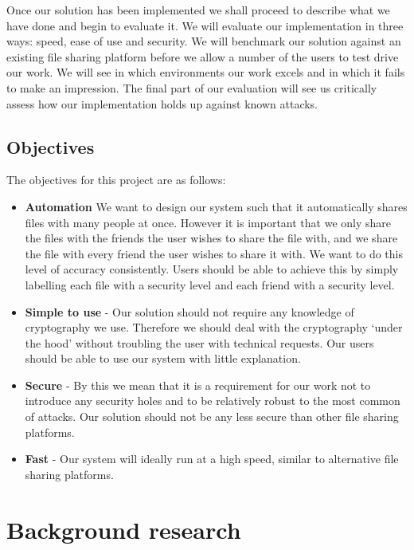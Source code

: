 \documentclass[12pt, titlepage]{article}
\begin{document}
\newline \indent Once our solution has been implemented we shall proceed to describe what we have done and begin to evaluate it. We will evaluate our implementation in three ways: speed, ease of use and security. We will benchmark our solution against an existing file sharing platform before we allow a number of the users to test drive our work. We will see in which environments our work excels and in which it fails to make an impression. The final part of our evaluation will see us critically assess how our implementation holds up against known attacks.

\subsection{Objectives}
The objectives for this project are as follows:
\begin{itemize}
	\item \textbf{Automation} We want to design our system such that it automatically shares files with many people at once. However it is important that we only share the files with the friends the user wishes to share the file with, and we share the file with every friend the user wishes to share it with. We want to do this level of accuracy consistently. Users should be able to achieve this by simply labelling each file with a security level and each friend with a security level.
	\item \textbf{Simple to use} - Our solution should not require any knowledge of cryptography we use. Therefore we should deal with the cryptography `under the hood' without troubling the user with technical requests. Our users should be able to use our system with little explanation.
	\item \textbf{Secure} - By this we mean that it is a requirement for our work not to introduce any security holes and to be relatively robust to the most common of attacks. Our solution should not be any less secure than other file sharing platforms.
	\item \textbf{Fast} - Our system will ideally run at a high speed, similar to alternative file sharing platforms.
\end{itemize} 

\newpage
\section{Background research}
\end{document}
